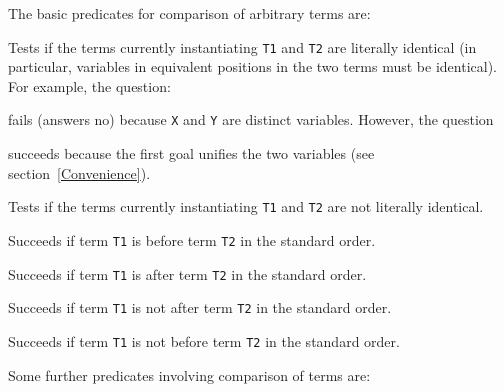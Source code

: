 The basic predicates for comparison of arbitrary terms are:
\begin{description}
    Tests if the terms currently instantiating {\tt T1} and {\tt T2}
    are literally identical (in particular, variables in equivalent positions
    in the two terms must be identical).
    For example, the question:


    \noindent
    fails (answers no) because {\tt X} and {\tt Y} are distinct variables.
    However, the question


    \noindent
    succeeds because the first goal unifies the two variables 
    (see section~\ref{Convenience}).

    Tests if the terms currently instantiating {\tt T1} and {\tt T2}
    are not literally identical.

    Succeeds if term {\tt T1} is before term {\tt T2} in the standard order.

    Succeeds if term {\tt T1} is after term {\tt T2} in the standard order.

    Succeeds if term {\tt T1} is not after term {\tt T2} in the standard order.

    Succeeds if term {\tt T1} is not before term {\tt T2} in the standard order.

\end{description}

Some further predicates involving comparison of terms are:

